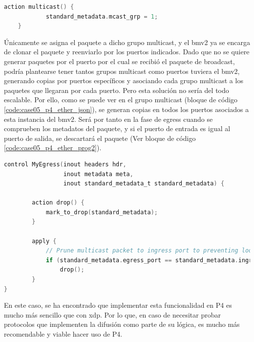 \begin{lstlisting}[language=C, style=P4-color, caption={Acción propuesta para llevar a cabo el Broadcast - Case05},label=code:case05_p4_ether_prog1]
    action multicast() {
            standard_metadata.mcast_grp = 1;
    }
\end{lstlisting}
\vspace{0.5cm}

Únicamente se asigna el paquete a dicho grupo multicast, y el \gls{bmv2} ya se encarga de clonar el paquete y reenviarlo por los puertos indicados. Dado que no se quiere generar paquetes por el puerto por el cual se recibió el paquete de broadcast, podría plantearse tener tantos grupos multicast como puertos tuviera el \gls{bmv2}, generando copias por puertos específicos y asociando cada grupo multicast a los paquetes que llegaran por cada puerto. Pero esta solución no sería del todo escalable. Por ello, como se puede ver en el grupo multicast (bloque de código \ref{code:case05_p4_ether_json}), se generan copias en todos los puertos asociados a esta instancia del \gls{bmv2}. Será por tanto en la fase de egress cuando se comprueben los metadatos del paquete, y si el puerto de entrada es igual al puerto de salida, se descartará el paquete (Ver bloque de código \ref{code:case05_p4_ether_prog2}).\\
\par

\begin{lstlisting}[language=C, style=P4-color, caption={Acción propuesta para descartar paquetes sobrantes de Broadcast - Case05},label=code:case05_p4_ether_prog2]
    control MyEgress(inout headers hdr,
                 inout metadata meta,
                 inout standard_metadata_t standard_metadata) {
    
        action drop() {
            mark_to_drop(standard_metadata);
        }
    
        apply {
            // Prune multicast packet to ingress port to preventing loop
            if (standard_metadata.egress_port == standard_metadata.ingress_port)
                drop();
        }
}

\end{lstlisting}
\vspace{0.5cm}

En este caso, se ha encontrado que implementar esta funcionalidad en P4 es mucho más sencillo que con \gls{xdp}. Por lo que, en caso de necesitar probar protocolos que implementen la difusión como parte de su lógica, es mucho más recomendable y viable hacer uso de P4.

